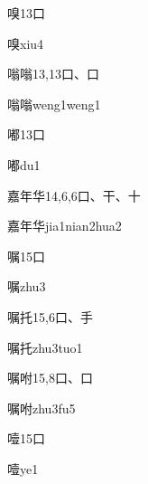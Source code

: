 \begin{entry}{嗅}{13}{⼝}
  \begin{phonetics}{嗅}{xiu4}
  \end{phonetics}
\end{entry}

\begin{entry}{嗡嗡}{13,13}{⼝、⼝}
  \begin{phonetics}{嗡嗡}{weng1weng1}
  \end{phonetics}
\end{entry}

\begin{entry}{嘟}{13}{⼝}
  \begin{phonetics}{嘟}{du1}
  \end{phonetics}
\end{entry}

\begin{entry}{嘉年华}{14,6,6}{⼝、⼲、⼗}
  \begin{phonetics}{嘉年华}{jia1nian2hua2}
  \end{phonetics}
\end{entry}

\begin{entry}{嘱}{15}{⼝}
  \begin{phonetics}{嘱}{zhu3}
  \end{phonetics}
\end{entry}

\begin{entry}{嘱托}{15,6}{⼝、⼿}
  \begin{phonetics}{嘱托}{zhu3tuo1}
  \end{phonetics}
\end{entry}

\begin{entry}{嘱咐}{15,8}{⼝、⼝}
  \begin{phonetics}{嘱咐}{zhu3fu5}
  \end{phonetics}
\end{entry}

\begin{entry}{噎}{15}{⼝}
  \begin{phonetics}{噎}{ye1}
  \end{phonetics}
\end{entry}

